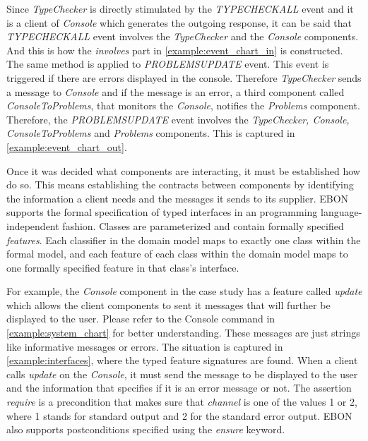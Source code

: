 \documentclass[conference]{IEEEtran}
\begin{document}
Since \emph{TypeChecker} is directly stimulated by the
\emph{TYPECHECKALL} event and it is a client of \emph{Console} which
generates the outgoing response, it can be said that\emph{
TYPECHECKALL} event involves the \emph{TypeChecker} and the
\emph{Console} components. And this is how the \emph{involves} part in
\autoref{example:event_chart_in} is constructed. The same method is
applied to \emph{PROBLEMSUPDATE} event. This event is triggered if
there are errors displayed in the console. Therefore
\emph{TypeChecker} sends a message to \emph{Console} and if the
message is an error, a third component called \emph{ConsoleToProblems},
that monitors the \emph{Console}, notifies the \emph{Problems}
component. Therefore, the \emph{PROBLEMSUPDATE} event involves the
\emph{TypeChecker, Console, ConsoleToProblems} and \emph{Problems}
components. This is captured in \autoref{example:event_chart_out}.



Once it was decided what components are interacting, it must be
established how do so.  This means establishing the contracts between
components by identifying the information a client needs and the
messages it sends to its supplier.  EBON supports the formal
specification of typed interfaces in an programming
language-independent fashion.  Classes are parameterized and contain
formally specified \emph{features}.  Each classifier in the domain
model maps to exactly one class within the formal model, and each
feature of each class within the domain model maps to one formally
specified feature in that class's interface.

For example, the \emph{Console} component in the case study has a
feature called \emph{update} which allows the client components to
sent it messages that will further be displayed to the user. Please
refer to the Console command in \autoref{example:system_chart} for
better understanding.  These messages are just strings like
informative messages or errors.  The situation is captured in
\autoref{example:interfaces}, where the typed feature signatures are
found.  When a client calls \emph{update} on the \emph{Console}, it
must send the message to be displayed to the user and the information
that specifies if it is an error message or not. The assertion
\emph{require} is a precondition that makes sure that \emph{channel}
is one of the values 1 or 2, where 1 stands for standard output and 2
for the standard error output.  EBON also supports postconditions
specified using the \emph{ensure} keyword.
\end{document}
